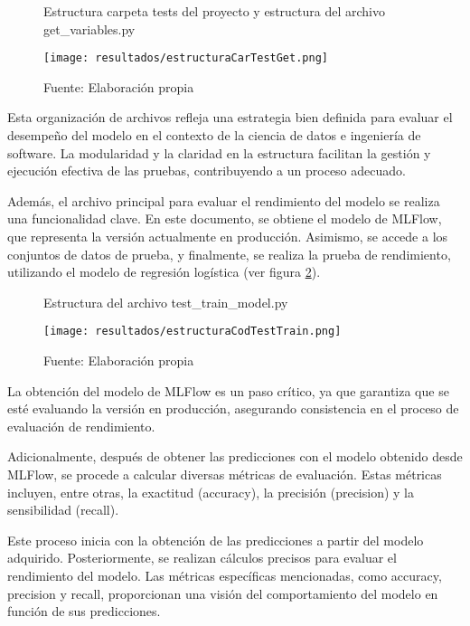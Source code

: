 \begin{figure}[h]
	\centering
	\caption{Estructura carpeta tests del proyecto y estructura del archivo get\_variables.py}
	\texttt{[image: resultados/estructuraCarTestGet.png]}
	\caption*{\footnotesize Fuente: Elaboración propia}
	\label{fig:figuraEstructuraCarTestGet}
\end{figure}

\newpage

Esta organización de archivos refleja una estrategia bien definida para evaluar el desempeño del modelo en el contexto de la ciencia de datos e ingeniería de software. La modularidad y la claridad en la estructura facilitan la gestión y ejecución efectiva de las pruebas, contribuyendo a un proceso adecuado. \newline

Además, el archivo principal para evaluar el rendimiento del modelo se realiza una funcionalidad clave. En este documento, se obtiene el modelo de MLFlow, que representa la versión actualmente en producción. Asimismo, se accede a los conjuntos de datos de prueba, y finalmente, se realiza la prueba de rendimiento, utilizando el modelo de regresión logística (ver figura \ref{fig:figuraEstructuraCodTestTrain}).

\begin{figure}[h]
	\centering
	\caption{Estructura del archivo test\_train\_model.py}
	\texttt{[image: resultados/estructuraCodTestTrain.png]}
	\caption*{\footnotesize Fuente: Elaboración propia}
	\label{fig:figuraEstructuraCodTestTrain}
\end{figure}

La obtención del modelo de MLFlow es un paso crítico, ya que garantiza que se esté evaluando la versión en producción, asegurando consistencia en el proceso de evaluación de rendimiento.

Adicionalmente, después de obtener las predicciones con el modelo obtenido desde MLFlow, se procede a calcular diversas métricas de evaluación. Estas métricas incluyen, entre otras, la exactitud (accuracy), la precisión (precision) y la sensibilidad (recall).

\newpage

Este proceso inicia con la obtención de las predicciones a partir del modelo adquirido. Posteriormente, se realizan cálculos precisos para evaluar el rendimiento del modelo. Las métricas específicas mencionadas, como accuracy, precision y recall, proporcionan una visión del comportamiento del modelo en función de sus predicciones. \newline

